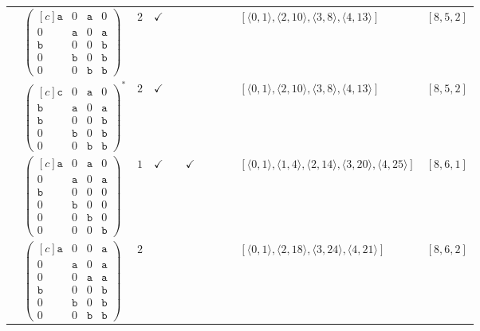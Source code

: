\documentclass[12pt]{article}
\theoremstyle{definition}
\theoremstyle{plain}
\begin{document}
{\begin{longtable}{@{}cYcccccccZc@{}}
\cmidrule(lr){2-11}

& $\begin{pmatrix*}[c]
\mathtt{a}  &  0  &  \mathtt{a}  &  0  \\
0  &  \mathtt{a}  &  0  &  \mathtt{a}  \\
\mathtt{b}  &  0  &  0  &  \mathtt{b}  \\
0  &  \mathtt{b}  &  0  &  \mathtt{b}   \\
0  &  0  &  \mathtt{b}  &  \mathtt{b}
\end{pmatrix*}$
& $2$
& $\checkmark$
&
&
&
&
&
& $[\langle0,1\rangle,\allowbreak\langle2,10\rangle,\allowbreak\langle3,8\rangle,\allowbreak\langle4,13\rangle]$
& $[8,5,2]$     \\

\cmidrule(lr){2-11}

& $\begin{pmatrix*}[c]
\mathtt{c}  &  0  &  \mathtt{a}  &  0  \\
\mathtt{b}  &  \mathtt{a}  &  0  &  \mathtt{a}  \\
\mathtt{b}  &  0  &  0  &  \mathtt{b}  \\
0  &  \mathtt{b}  &  0  &  \mathtt{b}   \\
0  &  0  &  \mathtt{b}  &  \mathtt{b}
\end{pmatrix*}^*$
& $2$
& $\checkmark$
&
&
&
&
&
& $[\langle0,1\rangle,\allowbreak\langle2,10\rangle,\allowbreak\langle3,8\rangle,\allowbreak\langle4,13\rangle]$
& $[8,5,2]$     \\

\cmidrule(lr){2-11}


& $\begin{pmatrix*}[c]
\mathtt{a}  &  0  &  \mathtt{a}  &  0  \\
0  &  \mathtt{a}  &  0  &  \mathtt{a}  \\
\mathtt{b}  &  0  &  0  &  0  \\
0  &  \mathtt{b}  &  0  &  0  \\
0  &  0  &  \mathtt{b}  &  0  \\
0  &  0  &  0  &  \mathtt{b}
\end{pmatrix*}$
& $1$
& $\checkmark$
&
& $\checkmark$
&
&
&
& $[\langle0,1\rangle,\allowbreak\langle1,4\rangle,\allowbreak\langle2,14\rangle,\allowbreak\langle3,20\rangle,\allowbreak\langle4,25\rangle]$
& $[8,6,1]$     \\

\cmidrule(lr){2-11}

& $\begin{pmatrix*}[c]
\mathtt{a}  &  0  &  0  &  \mathtt{a}    \\
0  &  \mathtt{a}  &  0  &  \mathtt{a}  \\
0  &  0  &  \mathtt{a}  &  \mathtt{a}  \\
\mathtt{b}  &  0  &  0  &  \mathtt{b}  \\
0  &  \mathtt{b}  &  0  &  \mathtt{b}   \\
0  &  0  &  \mathtt{b}  &  \mathtt{b}
\end{pmatrix*}$
& $2$
&
&
&
&
&
&
& $[\langle0,1\rangle,\allowbreak\langle2,18\rangle,\allowbreak\langle3,24\rangle,\allowbreak\langle4,21\rangle]$
& $[8,6,2]$     \\


\end{longtable}}
\end{document}

